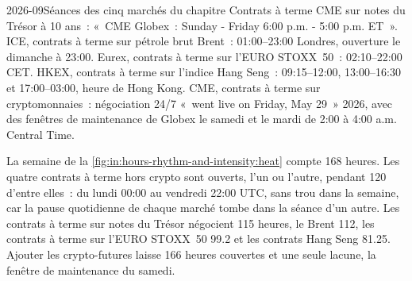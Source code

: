 \begin{dated}{2026-09}{Séances des cinq marchés du chapitre}\label{dat:in:hours-rhythm-and-intensity:sessions}
Contrats à terme CME sur notes du Trésor à 10 ans~: «~CME Globex~: Sunday - Friday 6:00 p.m. - 5:00 p.m. ET~». ICE, contrats à terme sur pétrole brut Brent~:
01:00--23:00 Londres, ouverture le dimanche à 23:00. Eurex, contrats à terme sur l'EURO STOXX~50~: 02:10--22:00 CET. HKEX, contrats à terme sur l'indice Hang Seng~:
09:15--12:00, 13:00--16:30 et 17:00--03:00, heure de Hong Kong. CME, contrats à terme sur cryptomonnaies~: négociation 24/7 «~went live on
Friday, May 29~» 2026, avec des fenêtres de maintenance de Globex le samedi et le mardi de 2:00 à 4:00 a.m. Central Time.
\end{dated}

\begin{omfigure}

\label{fig:in:hours-rhythm-and-intensity:heat}
\end{omfigure}

La semaine de la \cref{fig:in:hours-rhythm-and-intensity:heat} compte 168 heures. Les quatre contrats à terme hors crypto sont ouverts, l'un ou
l'autre, pendant 120 d'entre elles~: du lundi 00:00 au vendredi 22:00 UTC, sans trou dans la semaine, car la pause quotidienne de chaque marché
tombe dans la séance d'un autre. Les contrats à terme sur notes du Trésor négocient 115 heures, le Brent 112, les contrats à terme sur l'EURO STOXX~50
99.2 et les contrats Hang Seng 81.25. Ajouter les crypto-futures laisse 166 heures couvertes et une seule lacune, la fenêtre
de maintenance du samedi.

